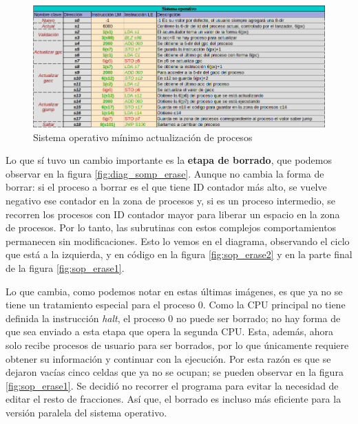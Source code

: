 \documentclass[letterpaper,12pt,oneside]{book}
\begin{document}
			\begin{figure}[H]		
				\centering
				\includegraphics[scale=0.53]{media/Paralela/sop_update.png}
				\caption{Sistema operativo mínimo actualización de procesos}
				\label{fig:sop_update}
			\end{figure}

			\newpage

			Lo que sí tuvo un cambio importante es la \textbf{etapa de borrado},
			que podemos observar en la figura \ref{fig:diag_somp_erase}. Aunque no cambia la forma de borrar: si el proceso
			a borrar es el que tiene ID contador más alto, se vuelve negativo ese contador en la zona de procesos y, si
			es un proceso intermedio, se recorren los procesos con ID contador mayor para liberar un espacio
			en la zona de procesos. Por lo tanto, las subrutinas con estos complejos comportamientos
			permanecen sin modificaciones. Esto lo vemos en el diagrama, observando el ciclo 
			que está a la izquierda, y en código en la figura \ref{fig:sop_erase2} y en la parte
			final de la figura \ref{fig:sop_erase1}.
   
            Lo que cambia, como podemos notar en estas últimas imágenes, es que ya no se tiene un tratamiento especial
			para el proceso 0. Como la CPU principal no tiene definida la instrucción \textit{halt}, el proceso 0 no puede ser borrado; no hay forma
			de que sea enviado a esta etapa que opera la segunda CPU. Esta, además,
			ahora solo recibe procesos de usuario para ser borrados, por lo que únicamente requiere 
			obtener
			su información y continuar con la ejecución. Por esta razón
			es que se dejaron vacías cinco celdas que ya no se ocupan; se pueden observar en la figura \ref{fig:sop_erase1}.
			Se decidió no recorrer el 
			programa
			para evitar la necesidad de editar el resto de fracciones. Así que, el borrado es incluso más eficiente para
			la versión paralela del sistema operativo.
			
\end{document}
